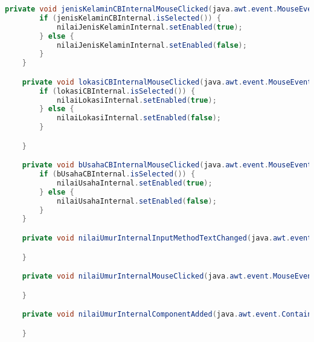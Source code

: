 \begin{lstlisting}[language=Java, caption=TampilanBobotKetetanggaan.java]
    private void jenisKelaminCBInternalMouseClicked(java.awt.event.MouseEvent evt) {                                                    
        if (jenisKelaminCBInternal.isSelected()) {
            nilaiJenisKelaminInternal.setEnabled(true);
        } else {
            nilaiJenisKelaminInternal.setEnabled(false);
        }
    }                                                   

    private void lokasiCBInternalMouseClicked(java.awt.event.MouseEvent evt) {                                              
        if (lokasiCBInternal.isSelected()) {
            nilaiLokasiInternal.setEnabled(true);
        } else {
            nilaiLokasiInternal.setEnabled(false);
        }

    }                                             

    private void bUsahaCBInternalMouseClicked(java.awt.event.MouseEvent evt) {                                              
        if (bUsahaCBInternal.isSelected()) {
            nilaiUsahaInternal.setEnabled(true);
        } else {
            nilaiUsahaInternal.setEnabled(false);
        }
    }                                             

    private void nilaiUmurInternalInputMethodTextChanged(java.awt.event.InputMethodEvent evt) {                                                         

    }                                                        

    private void nilaiUmurInternalMouseClicked(java.awt.event.MouseEvent evt) {                                               

    }                                              

    private void nilaiUmurInternalComponentAdded(java.awt.event.ContainerEvent evt) {                                                 

    }                                                


\end{lstlisting}
